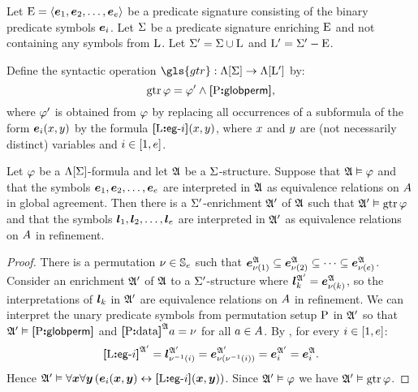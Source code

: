 Let ${\mathrm{E}} = \left\langle \bm{e}_{1},\bm{e}_{2},\dots,\bm{e}_{e} \right\rangle$ be a predicate signature consisting
of the binary predicate symbols $\bm{e}_{i}$.
Let $\mathrm{\Sigma}$ be a predicate signature enriching ${\mathrm{E}}$ and not
containing any symbols from ${\mathrm{L}}$.
Let $\mathrm{\Sigma'} = \mathrm{\Sigma} \cup {\mathrm{L}}$ and
${{\mathrm{L}}'} = \mathrm{\Sigma'} - {\mathrm{E}}$.

\begin{definition}
Define the syntactic operation $\gls{gtr} : \aLF\SigS \to \aLF\LSp$ by:
\[
  \operatorname{gtr}\varphi = {\varphi'} \land {\bm{[}{\mathrm{P}}\mathord{\bm{:}}\mathsf{globperm}\bm{]}},
\]
where ${\varphi'}$ is obtained from $\varphi$ by replacing all occurrences of a
subformula of the form $\bm{e}_{i}(x,y)$ by the formula ${\bm{[}{\mathrm{L}}\mathord{\bm{:}}\mathsf{eg}{\hbox{-}}i\bm{]}}(x,y)$, 
where $x$ and $y$ are (not necessarily distinct) variables and
$i \in [1,e]$.
\end{definition}

\begin{remark}\label{rem:global-e-to-m}
Let $\varphi$ be a $\Lambda[\mathrm{\Sigma}]$-formula and let $\mathfrak{A}$ be a
$\mathrm{\Sigma}$-structure.
Suppose that $\mathfrak{A} \vDash \varphi$ and that the symbols 
$\bm{e}_{1}, \bm{e}_{2}, \dots, \bm{e}_{e}$ are interpreted in $\mathfrak{A}$ as equivalence
relations on $A$ in global agreement.
Then there is a $\mathrm{\Sigma'}$-enrichment $\mathfrak{A'}$ of $\mathfrak{A}$
such that $\mathfrak{A'} \vDash \operatorname{gtr}\varphi$ and that the symbols
$\bm{l}_{1},\bm{l}_{2}, \dots, \bm{l}_{e}$ are interpreted in $\mathfrak{A'}$ as equivalence
relations on $A$ in refinement.
\end{remark}
\begin{proof}
There is a permutation $\nu \in \mathbb{S}_{e}$ such that
$\bm{e}_{\nu(1)}^{\mathfrak{A}} \subseteq
\bm{e}_{\nu(2)}^{\mathfrak{A}} \subseteq
\dots \subseteq
\bm{e}_{\nu(e)}^{\mathfrak{A}}$.
Consider an enrichment $\mathfrak{A'}$ of $\mathfrak{A}$
to a $\mathrm{\Sigma'}$-structure where 
$\bm{l}_{k}^{\mathfrak{A'}} = \bm{e}_{\nu(k)}^{\mathfrak{A}}$,
so the interpretations of $\bm{l}_{k}$ in $\mathfrak{A'}$ 
are equivalence relations on $A$ in refinement.
We can interpret the unary predicate symbols from permutation setup 
${\mathrm{P}}$ in $\mathfrak{A'}$ so that 
$\mathfrak{A'} \vDash {\bm{[}{\mathrm{P}}\mathord{\bm{:}}\mathsf{globperm}\bm{]}}$ and 
${\bm{[}{\mathrm{P}}\mathord{\bm{:}}\mathrm{data}\bm{]}}^{\mathfrak{A}}a = \nu$ for all $a \in A$.
By , for every $i \in [1,e]$:
\[
  {\bm{[}{\mathrm{L}}\mathord{\bm{:}}\mathsf{eg}{\hbox{-}}i\bm{]}}^{\mathfrak{A'}} =
  \bm{l}_{\nu^{-1}(i)}^{\mathfrak{A'}} =
  \bm{e}_{\nu(\nu^{-1}(i))}^{\mathfrak{A'}} =
  \bm{e}_{i}^{\mathfrak{A'}} =
  \bm{e}_{i}^{\mathfrak{A}}.
\]
Hence $\mathfrak{A'} \vDash
  \forall\bm{x}\forall\bm{y}
  \left(\bm{e}_{i}(\bm{x},\bm{y}) \leftrightarrow {\bm{[}{\mathrm{L}}\mathord{\bm{:}}\mathsf{eg}{\hbox{-}}i\bm{]}}(\bm{x},\bm{y})\right)$.
Since $\mathfrak{A'} \vDash \varphi$ we have $\mathfrak{A'} \vDash \operatorname{gtr}\varphi$.
\end{proof}

